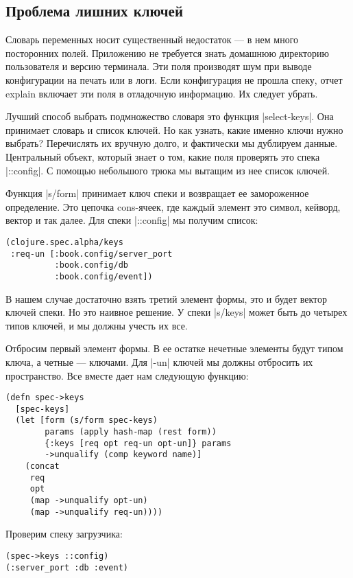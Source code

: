 \subsection{Проблема лишних ключей}

Словарь переменных носит существенный недостаток — в нем много посторонних
полей. Приложению не требуется знать домашнюю директорию пользователя и версию
терминала. Эти поля производят шум при выводе конфигурации на печать или в
логи. Если конфигурация не прошла спеку, отчет explain включает эти поля в
отладочную информацию. Их следует убрать.

Лучший способ выбрать подмножество словаря это функция \spverb|select-keys|. Она
принимает словарь и список ключей. Но как узнать, какие именно ключи нужно
выбрать? Перечислять их вручную долго, и фактически мы дублируем
данные. Центральный объект, который знает о том, какие поля проверять это спека
\spverb|::config|. С помощью небольшого трюка мы вытащим из нее список ключей.

Функция \spverb|s/form| принимает ключ спеки и возвращает ее замороженное
определение. Это цепочка cons-ячеек, где каждый элемент это символ, кейворд,
вектор и так далее. Для спеки \spverb|::config| мы получим список:

\begin{verbatim}
(clojure.spec.alpha/keys
 :req-un [:book.config/server_port
          :book.config/db
          :book.config/event])
\end{verbatim}

В нашем случае достаточно взять третий элемент формы, это и будет вектор ключей
спеки. Но это наивное решение. У спеки \spverb|s/keys| может быть до четырех типов
ключей, и мы должны учесть их все.

Отбросим первый элемент формы. В ее остатке нечетные элементы будут типом ключа,
а четные — ключами. Для \spverb|-un| ключей мы должны отбросить их пространство. Все
вместе дает нам следующую функцию:

\begin{verbatim}
(defn spec->keys
  [spec-keys]
  (let [form (s/form spec-keys)
        params (apply hash-map (rest form))
        {:keys [req opt req-un opt-un]} params
        ->unqualify (comp keyword name)]
    (concat
     req
     opt
     (map ->unqualify opt-un)
     (map ->unqualify req-un))))
\end{verbatim}

Проверим спеку загрузчика:

\begin{verbatim}
(spec->keys ::config)
(:server_port :db :event)
\end{verbatim}

